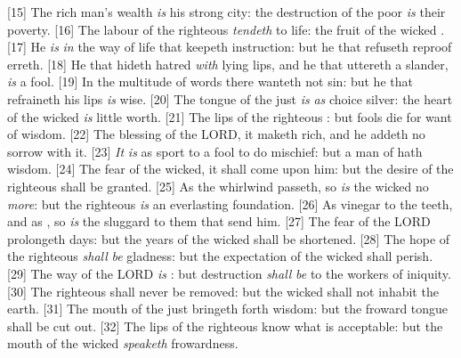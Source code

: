 [15] \textcolor[cmyk]{0.99998,1,0,0}{The  rich man's wealth \emph{is} his strong city: the destruction of the poor \emph{is} their poverty.}
[16] \textcolor[cmyk]{0.99998,1,0,0}{The  labour of the righteous \emph{tendeth} to life: the fruit of the wicked .}
[17] \textcolor[cmyk]{0.99998,1,0,0}{He  \emph{is} \emph{in} the way of life that keepeth instruction: but he that refuseth reproof erreth.}
[18] \textcolor[cmyk]{0.99998,1,0,0}{He  that hideth hatred \emph{with} lying lips, and he that uttereth a slander, \emph{is} a fool.}
[19] \textcolor[cmyk]{0.99998,1,0,0}{In  the multitude of words there wanteth not sin: but he that refraineth his lips \emph{is} wise.}
[20] \textcolor[cmyk]{0.99998,1,0,0}{The tongue of the just \emph{is} \emph{as} choice silver: the heart of the wicked \emph{is} little worth.}
[21] \textcolor[cmyk]{0.99998,1,0,0}{The lips of the righteous : but fools die for want of wisdom.}
[22] \textcolor[cmyk]{0.99998,1,0,0}{The blessing of the LORD, it maketh rich, and he addeth no sorrow with it.}
[23] \textcolor[cmyk]{0.99998,1,0,0}{\emph{It} \emph{is} as sport to a fool to do mischief: but a man of  hath wisdom.}
[24] \textcolor[cmyk]{0.99998,1,0,0}{The fear of the wicked, it shall come upon him: but the desire of the righteous shall be granted.}
[25] \textcolor[cmyk]{0.99998,1,0,0}{As the whirlwind passeth, so \emph{is} the wicked no \emph{more}: but the righteous \emph{is} an everlasting foundation.}
[26] \textcolor[cmyk]{0.99998,1,0,0}{As vinegar to the teeth, and as , so \emph{is} the sluggard to them that send him.}
[27] \textcolor[cmyk]{0.99998,1,0,0}{The fear of the LORD prolongeth days: but the years of the wicked shall be shortened.}
[28] \textcolor[cmyk]{0.99998,1,0,0}{The hope of the righteous \emph{shall} \emph{be} gladness: but the expectation of the wicked shall perish.}
[29] \textcolor[cmyk]{0.99998,1,0,0}{The way of the LORD \emph{is} : but destruction \emph{shall} \emph{be} to the workers of iniquity.}
[30] \textcolor[cmyk]{0.99998,1,0,0}{The righteous shall never be removed: but the wicked shall not inhabit the earth.}
[31] \textcolor[cmyk]{0.99998,1,0,0}{The mouth of the just bringeth forth wisdom: but the froward tongue shall be cut out.}
[32] \textcolor[cmyk]{0.99998,1,0,0}{The lips of the righteous know what is acceptable: but the mouth of the wicked \emph{speaketh} frowardness.}

